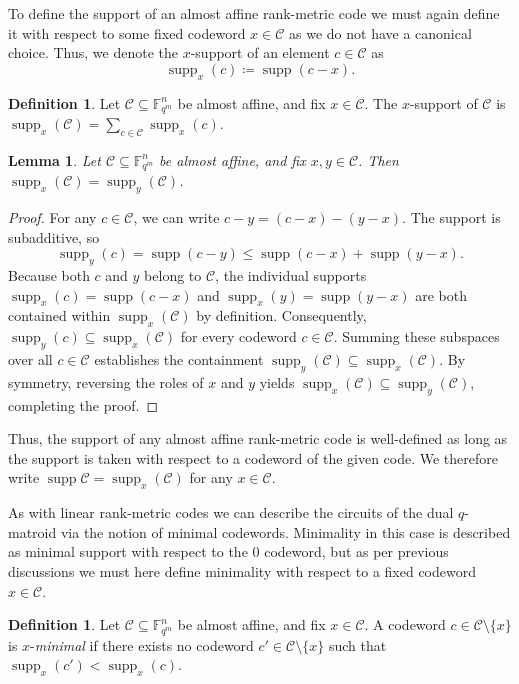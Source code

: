 \documentclass[a4paper,11pt,reqno]{article}
\newcommand{\F}{\mathbb{F}}
\newcommand{\supp}{\operatorname{supp}}
\newcommand{\C}{\mathcal{C}}
\theoremstyle{plain} \numberwithin{equation}{section}
\newtheorem{lemma}[theorem]{Lemma}
\theoremstyle{definition}
\newtheorem{definition}[theorem]{Definition}
\begin{document}
To define the support of an almost affine rank-metric code we must again define it with respect to some fixed codeword $x\in \C$ as we do not have a canonical choice. Thus, we denote the $x$-support of an element $c\in \C$ as $$\supp_{x}(c)\coloneqq \supp(c-x).$$

\begin{definition}
Let $\C\subseteq \F_{q^m}^n$ be almost affine, and fix $x\in \C$. The $x$-support of $\C$ is $\supp_x(\C) = \sum _{c\in \C} \supp_x(c)$.
\end{definition}

\begin{lemma}
    Let $\C\subseteq \F_{q^m}^n$ be almost affine, and fix $x,y\in \C$. Then $\supp_x(\C) = \supp_y(\C)$.
\end{lemma}
\begin{proof}
    For any $c \in \mathcal{C}$, we can write $c - y = (c - x) - (y - x)$. The support is subadditive, so
    \[\supp_y(c) = \supp(c - y) \leq  \supp(c - x) + \supp(y - x).\]
    Because both $c$ and $y$ belong to $\mathcal{C}$, the individual supports $\supp_x(c) = \supp(c - x)$ and $\supp_x(y) = \supp(y - x)$ are both contained within $\supp_x(\mathcal{C})$ by definition. Consequently, $\supp_y(c) \subseteq \supp_x(\mathcal{C})$ for every codeword $c \in \mathcal{C}$. Summing these subspaces over all $c \in \mathcal{C}$ establishes the containment $\supp_y(\mathcal{C}) \subseteq \supp_x(\mathcal{C})$. By symmetry, reversing the roles of $x$ and $y$ yields $\supp_x(\mathcal{C}) \subseteq \supp_y(\mathcal{C})$, completing the proof.
\end{proof}
Thus, the support of any almost affine rank-metric code is well-defined as long as the support is taken with respect to a codeword of the given code. We therefore write $\supp \C = \supp_x(\C)$ for any $x\in \C$.

As with linear rank-metric codes we can describe the circuits of the dual $q$-matroid via the notion of minimal codewords. Minimality in this case is described as minimal support with respect to the $0$ codeword, but as per previous discussions we must here define minimality with respect to a fixed codeword $x\in \C$. 

\begin{definition}
Let $\C\subseteq \F_{q^m}^n$ be almost affine, and fix $x\in \C$. A codeword $c\in \C\setminus\{x\}$ is $x$-\emph{minimal} if there exists no codeword $c'\in \C\setminus \{x\}$ such that $\supp_x(c')<\supp_x(c)$.
\end{definition}
\end{document}

